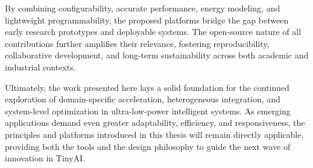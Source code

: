         By combining configurability, accurate performance, energy modeling, and lightweight programmability, the proposed platforms bridge the gap between early research prototypes and deployable systems. The open-source nature of all contributions further amplifies their relevance, fostering reproducibility, collaborative development, and long-term sustainability across both academic and industrial contexts.
        
        Ultimately, the work presented here lays a solid foundation for the continued exploration of domain-specific acceleration, heterogeneous integration, and system-level optimization in ultra-low-power intelligent systems. As emerging applications demand even greater adaptability, efficiency, and responsiveness, the principles and platforms introduced in this thesis will remain directly applicable, providing both the tools and the design philosophy to guide the next wave of innovation in TinyAI.
